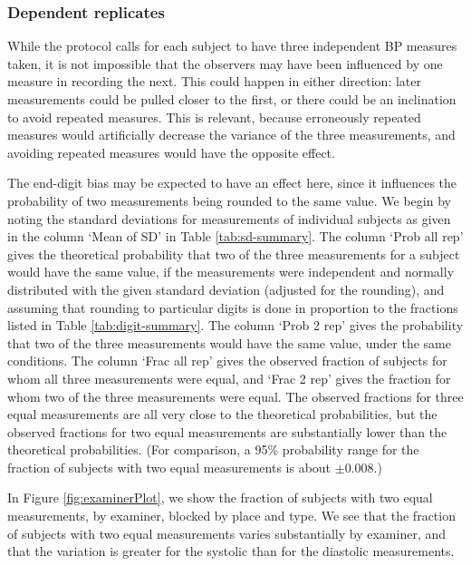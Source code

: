 \documentclass[
]{article}
\begin{document}
\hypertarget{sec:pseudorep}{%
\subsubsection{Dependent replicates}\label{sec:pseudorep}}

While the protocol calls for each subject to have three independent BP measures taken, it is not impossible that the observers may have been influenced by one measure in recording the next.
This could happen in either direction: later measurements could be pulled closer to the first, or there could be an inclination to avoid repeated measures.
This is relevant, because erroneously repeated measures would artificially decrease the variance of the three measurements, and avoiding repeated measures would have the opposite effect.

The end-digit bias may be expected to have an effect here, since it influences the probability of two measurements being rounded to the same value.
We begin by noting the standard deviations for measurements of individual subjects as given in the column `Mean of SD' in Table \ref{tab:sd-summary}.
The column `Prob all rep' gives the theoretical probability that two of the three measurements for a subject would have the same value, if the measurements were independent and normally distributed with the given standard deviation (adjusted for the rounding), and assuming that rounding to particular digits is done in proportion to the fractions listed in Table \ref{tab:digit-summary}.
The column `Prob 2 rep' gives the probability that two of the three measurements would have the same value, under the same conditions.
The column `Frac all rep' gives the observed fraction of subjects for whom all three measurements were equal, and `Frac 2 rep' gives the fraction for whom two of the three measurements were equal.
The observed fractions for three equal measurements are all very close to the theoretical probabilities, but the observed fractions for two equal measurements are substantially lower than the theoretical probabilities.
(For comparison, a 95\% probability range for the fraction of subjects with two equal measurements is about \(\pm 0.008\).)

In Figure \ref{fig:examinerPlot}, we show the fraction of subjects with two equal measurements, by examiner, blocked by place and type.
We see that the fraction of subjects with two equal measurements varies substantially by examiner, and that the variation is greater for the systolic than for the diastolic measurements.
\end{document}
